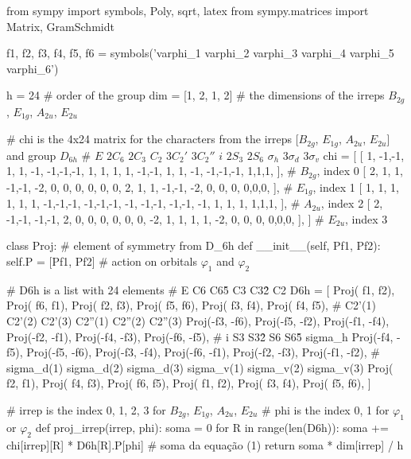 \documentclass[a4paper,10pt]{article}
\begin{document}
\begin{Python}
from sympy import symbols, Poly, sqrt, latex
from sympy.matrices import Matrix, GramSchmidt

f1, f2, f3, f4, f5, f6 = symbols('varphi_1 varphi_2 varphi_3 varphi_4 varphi_5 varphi_6')

h = 24  # order of the group
dim = [1, 2, 1, 2]  # the dimensions of the irreps $B_{2g}$, $E_{1g}$, $A_{2u}$, $E_{2u}$

# chi is the 4x24 matrix for the characters from the irreps [$B_{2g}$, $E_{1g}$, $A_{2u}$, $E_{2u}$] and group $D_{6h}$
#         $E$  $2 C_6$    $2 C_3$  $C_2$     $3 C_2'$      $3 C_2''$      $i$    $2 S_3$     $2 S_6$  $\sigma_h$    $3 \sigma_d$     $3 \sigma_v$
chi = [ [ 1, -1,-1,  1, 1, -1,  -1,-1,-1,  1, 1, 1,   1,  -1,-1,   1, 1, -1, -1,-1,-1, 1,1,1, ],     #  $B_{2g}$, index 0
        [ 2,  1, 1, -1,-1, -2,   0, 0, 0,  0, 0, 0,   2,   1, 1,  -1,-1, -2,  0, 0, 0, 0,0,0, ],     #  $E_{1g}$, index 1
        [ 1,  1, 1,  1, 1,  1,  -1,-1,-1, -1,-1,-1,  -1,  -1,-1,  -1,-1, -1,  1, 1, 1, 1,1,1, ],     #  $A_{2u}$, index 2
        [ 2, -1,-1, -1,-1,  2,   0, 0, 0,  0, 0, 0,  -2,   1, 1,   1, 1, -2,  0, 0, 0, 0,0,0, ], ]   #  $E_{2u}$, index 3

class Proj:     # element of symmetry from D\_6h
    def __init__(self, Pf1, Pf2):
        self.P = [Pf1, Pf2]     # action on orbitals $\varphi_1$ and $\varphi_2$

# D6h is a list with 24 elements
#              E               C6             C6\^5            C3            C3\^2             C2
D6h = [ Proj( f1,  f2), Proj( f6,  f1), Proj( f2,  f3), Proj( f5,  f6), Proj( f3,  f4), Proj( f4,  f5),
#            C2'(1)          C2'(2)         C2'(3)         C2''(1)        C2''(2)          C2''(3)
        Proj(-f3, -f6), Proj(-f5, -f2), Proj(-f1, -f4), Proj(-f2, -f1), Proj(-f4, -f3), Proj(-f6, -f5),
#              i              S3             S3\^2             S6           S6\^5            sigma\_h
        Proj(-f4, -f5), Proj(-f5, -f6), Proj(-f3, -f4), Proj(-f6, -f1), Proj(-f2, -f3), Proj(-f1, -f2),
#           sigma\_d(1)     sigma\_d(2)      sigma\_d(3)     sigma\_v(1)      sigma\_v(2)     sigma\_v(3)
        Proj( f2,  f1), Proj( f4,  f3), Proj( f6,  f5), Proj( f1,  f2), Proj( f3,  f4), Proj( f5,  f6),  ]

# irrep is the index 0, 1, 2, 3 for $B_{2g}$, $E_{1g}$, $A_{2u}$, $E_{2u}$
# phi is the index 0, 1 for $\varphi_1$ or $\varphi_2$
def proj_irrep(irrep, phi):
    soma = 0
    for R in range(len(D6h)):
        soma += chi[irrep][R] * D6h[R].P[phi]   # soma da equação (1)
    return soma * dim[irrep] / h


\end{Python}
\end{document}

